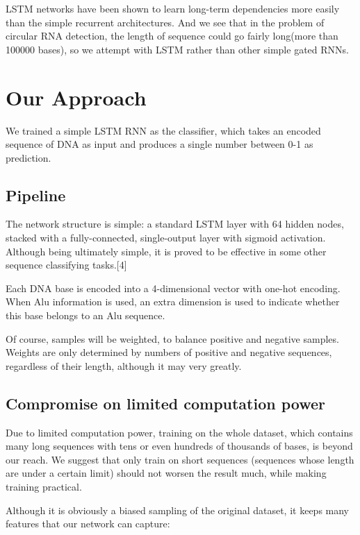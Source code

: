 \documentclass[10pt,a4paper]{article}
\begin{document}
\begin{spacing}{1.5}
		LSTM networks have been shown to learn long-term dependencies more easily than the simple recurrent architectures. And we see that in the problem of circular RNA detection, the length of sequence could go fairly long(more than 100000 bases), so we attempt with LSTM rather than other simple gated RNNs.
		
		\section{Our Approach}
		
		We trained a simple LSTM RNN as the classifier, which takes an encoded sequence of DNA as input and produces a single number between 0-1 as prediction.
		
		\subsection{Pipeline}
		
		The network structure is simple: a standard LSTM layer with 64 hidden nodes, stacked with a fully-connected, single-output layer with sigmoid activation. Although being ultimately simple, it is proved to be effective in some other sequence classifying tasks.[4] 
		
		Each DNA base is encoded into a 4-dimensional vector with one-hot encoding. When Alu information is used, an extra dimension is used to indicate whether this base belongs to an Alu sequence.
		
		Of course, samples will be weighted, to balance positive and negative samples. Weights are only determined by numbers of positive and negative sequences, regardless of their length, although it may very greatly.
		
		\subsection{Compromise on limited computation power}
		
		Due to limited computation power, training on the whole dataset, which contains many long sequences with tens or even hundreds of thousands of bases, is beyond our reach. We suggest that only train on short sequences (sequences whose length are under a certain limit) should not worsen the result much, while making training practical.
		
		Although it is obviously a biased sampling of the original dataset, it keeps many features that our network can capture:
		

\end{spacing}
\end{document}
